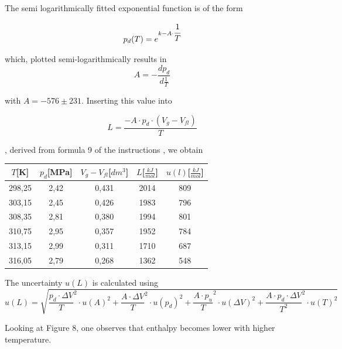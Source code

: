 \documentclass[10pt,a4paper]{article}
\begin{document}
The semi logarithmically fitted exponential function is of the form

\begin{align}
p_d(T) = e^{k -A \cdot \cfrac{1}{T}}
\end{align}

which, plotted semi-logarithmically results in
\begin{equation}
A = -\frac{dp_d}{d\frac{1}{T}}
\end{equation}

with $A = -576 \pm 231$. Inserting this value into 

\begin{equation}
L = \frac{-A \cdot p_d \cdot (V_g - V_{fl})}{T}
\end{equation}

, derived from formula 9 of the instructions \cite{instructions}, we obtain

\begin{center}
\begin{tabular}{|c|c|c|c|c|}
\hline 
$T$[K] & $p_d$[MPa] & $V_g-V_{fl}$[$dm^3$] & $L$[$\frac{kJ}{mol}$] & $u(l)$[$\frac{kJ}{mol}$]  \\ 
\hline 
298,25 & 2,42 & 0,431 & 2014 & 809\\ 
\hline 
303,15 & 2,45 & 0,426 & 1983 & 796\\ 
\hline 
308,35 & 2,81 & 0,380 & 1994 & 801\\ 
\hline 
310,75 & 2,95 & 0,357 & 1952 & 784\\ 
\hline 
313,15 & 2,99 & 0,311 & 1710 & 687\\ 
\hline 
316,05 & 2,79 & 0,268 & 1362 & 548\\ 
\hline 
\end{tabular} 
\end{center}

The uncertainty $u(L)$ is calculated using
\begin{equation}
u(L) = \sqrt{\frac{p_d \cdot \Delta V}{T}^2 \cdot u(A)^2 + \frac{A \cdot \Delta V}{T}^2 \cdot u(p_d)^2 + \frac{A \cdot p_u}{T}^2  \cdot  u(\Delta V)^2 + \frac{A \cdot p_d \cdot \Delta V}{T^2}^2  \cdot  u(T)^2}
\end{equation}

Looking at Figure 8, one observes that enthalpy becomes lower with higher temperature.
\end{document}
